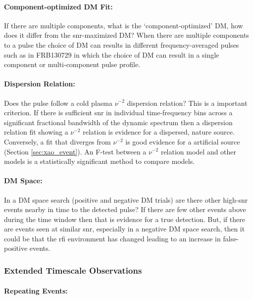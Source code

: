 \documentclass[a4paper,fleqn,usenatbib]{mnras}
\begin{document}
\paragraph{Component-optimized DM Fit:}

If there are multiple components, what is the `component-optimized' DM, how does
it differ from the \gls{snr}-maximized DM? When there are multiple components to
a pulse the choice of DM can results in different frequency-averaged pulses such
as in FRB130729 in which the choice of DM can result in a single component or
multi-component pulse profile. 

\paragraph{Dispersion Relation:}

Does the pulse follow a cold plasma $\nu^{-2}$ dispersion relation? This is a
important criterion. If there is sufficient \gls{snr} in individual
time-frequency bins across a significant fractional bandwidth of the dynamic
spectrum then a dispersion relation fit showing a $\nu^{-2}$ relation is
evidence for a dispersed, nature source. Conversely, a fit that diverges from
$\nu^{-2}$ is good evidence for a artificial source (Section
\ref{sec:xao_event}). An F-test between a $\nu^{-2}$ relation model and
other models is a statistically significant method to compare models.

\paragraph{DM Space:}

In a DM space search (positive and negative DM trials) are there other
high-\gls{snr} events nearby in time to the detected pulse? If there are few
other events above during the time window then that is evidence for a true
detection. But, if there are events seen at similar \gls{snr}, especially in a
negative DM space search, then it could be that the \gls{rfi} environment has
changed leading to an increase in false-positive events.

\subsubsection{Extended Timescale Observations}

\paragraph{Repeating Events:}
\end{document}
